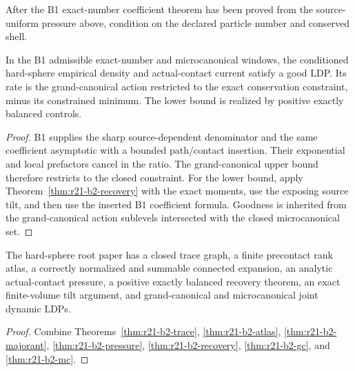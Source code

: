 After the B1 exact-number coefficient theorem has been proved from the
source-uniform pressure above, condition on the declared particle number and
conserved shell.

\begin{theorem}
\label{thm:r21-b2-mc}
In the B1 admissible exact-number and microcanonical windows, the conditioned
hard-sphere empirical density and actual-contact current satisfy a good LDP.
Its rate is the grand-canonical action restricted to the exact conservation
constraint, minus its constrained minimum.  The lower bound is realized by
positive exactly balanced controls.
\end{theorem}

\begin{proof}
B1 supplies the sharp source-dependent denominator and the same coefficient
asymptotic with a bounded path/contact insertion.  Their exponential and local
prefactors cancel in the ratio.  The grand-canonical upper bound therefore
restricts to the closed constraint.  For the lower bound, apply
Theorem~\ref{thm:r21-b2-recovery} with the exact moments, use the exposing
source tilt, and then use the inserted B1 coefficient formula.  Goodness is
inherited from the grand-canonical action sublevels intersected with the
closed microcanonical set.
\end{proof}

\begin{theorem}
\label{thm:r21-b2-main}
The hard-sphere root paper has a closed trace graph, a finite precontact rank
atlas, a correctly normalized and summable connected expansion, an analytic
actual-contact pressure, a positive exactly balanced recovery theorem, an
exact finite-volume tilt argument, and grand-canonical and microcanonical
joint dynamic LDPs.
\end{theorem}

\begin{proof}
Combine Theorems~\ref{thm:r21-b2-trace},
\ref{thm:r21-b2-atlas}, \ref{thm:r21-b2-majorant},
\ref{thm:r21-b2-pressure}, \ref{thm:r21-b2-recovery},
\ref{thm:r21-b2-gc}, and \ref{thm:r21-b2-mc}.
\end{proof}
